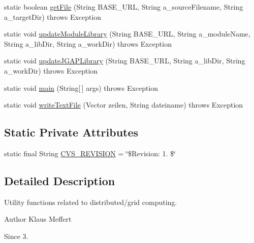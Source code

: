 \begin{DoxyCompactItemize}
\item 
static boolean \hyperlink{classorg_1_1jgap_1_1distr_1_1grid_1_1util_1_1_grid_kit_a301c7826bbee00cc4f4331f949ddfad5}{get\-File} (String B\-A\-S\-E\-\_\-\-U\-R\-L, String a\-\_\-source\-Filename, String a\-\_\-target\-Dir)  throws Exception 
\item 
static void \hyperlink{classorg_1_1jgap_1_1distr_1_1grid_1_1util_1_1_grid_kit_afa78889ffda168512995505a1ded1b3b}{update\-Module\-Library} (String B\-A\-S\-E\-\_\-\-U\-R\-L, String a\-\_\-module\-Name, String a\-\_\-lib\-Dir, String a\-\_\-work\-Dir)  throws Exception 
\item 
static void \hyperlink{classorg_1_1jgap_1_1distr_1_1grid_1_1util_1_1_grid_kit_aefa9d0afe5abc0c1c611c053d9a06140}{update\-J\-G\-A\-P\-Library} (String B\-A\-S\-E\-\_\-\-U\-R\-L, String a\-\_\-lib\-Dir, String a\-\_\-work\-Dir)  throws Exception 
\item 
static void \hyperlink{classorg_1_1jgap_1_1distr_1_1grid_1_1util_1_1_grid_kit_a04a7d87355d59fc4d9168408da19c530}{main} (String\mbox{[}$\,$\mbox{]} args)  throws Exception 
\item 
static void \hyperlink{classorg_1_1jgap_1_1distr_1_1grid_1_1util_1_1_grid_kit_a66dfea15c75a5bc3dfde593c6794948b}{write\-Text\-File} (Vector zeilen, String dateiname)  throws Exception 
\end{DoxyCompactItemize}
\subsection*{Static Private Attributes}
\begin{DoxyCompactItemize}
\item 
static final String \hyperlink{classorg_1_1jgap_1_1distr_1_1grid_1_1util_1_1_grid_kit_a84c725af08ec5d6544cbce8e7658e023}{C\-V\-S\-\_\-\-R\-E\-V\-I\-S\-I\-O\-N} = \char`\"{}\$Revision\-: 1. \$\char`\"{}
\end{DoxyCompactItemize}


\subsection{Detailed Description}
Utility functions related to distributed/grid computing.

\begin{DoxyAuthor}{Author}
Klaus Meffert 
\end{DoxyAuthor}
\begin{DoxySince}{Since}
3. 
\end{DoxySince}


